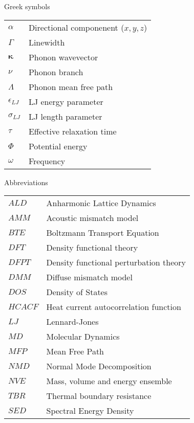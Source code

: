 Greek symbols\\
\begin{longtable}{ l l }
$\alpha$ & Directional componenent ($x,y,z$)\\
$\Gamma$ & Linewidth\\
$\pmb{\kappa}$ & Phonon wavevector\\ 
$\nu$ & Phonon branch\\
$\Lambda$ & Phonon mean free path\\
$\epsilon_{LJ}$ & LJ energy parameter\\
$\sigma_{LJ}$ & LJ length parameter\\
$\tau$ & Effective relaxation time\\ 
$\Phi$ & Potential energy\\
$\omega$ & Frequency\\
\end{longtable}
\newpage
Abbreviations\\
\begin{longtable}{ l l }
$ALD$ & Anharmonic Lattice Dynamics \\
$AMM$ & Acoustic mismatch model \\
$BTE$ & Boltzmann Transport Equation \\
$DFT$ & Density functional theory \\
$DFPT$ & Density functional perturbation theory \\
$DMM$ & Diffuse mismatch model \\
$DOS$ & Density of States \\
$HCACF$ & Heat current autocorrelation function\\
$LJ$ & Lennard-Jones\\
$MD$ & Molecular Dynamics\\
$MFP$ & Mean Free Path\\
$NMD$ & Normal Mode Decomposition\\
$NVE$ & Mass, volume and energy ensemble\\
$TBR$ & Thermal boundary resistance\\
$SED$ & Spectral Energy Density\\
\end{longtable}
